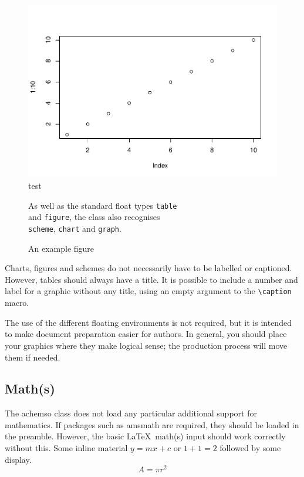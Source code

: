 \documentclass[journal=jacsat,manuscript=article]{achemso}
\begin{document}
\begin{figure}[htbp]
\centering
\includegraphics{Manuscript_files/figure-latex/unnamed-chunk-1-1.pdf}
\caption{test}
\end{figure}

\begin{figure}
  As well as the standard float types \texttt{table}\\
  and \texttt{figure}, the class also recognises\\
  \texttt{scheme}, \texttt{chart} and \texttt{graph}.
  \caption{An example figure}
  \label{fgr:example}
\end{figure}

Charts, figures and schemes do not necessarily have to be labelled or
captioned. However, tables should always have a title. It is possible to
include a number and label for a graphic without any title, using an
empty argument to the \texttt{\textbackslash caption} macro.

The use of the different floating environments is not required, but it
is intended to make document preparation easier for authors. In general,
you should place your graphics where they make logical sense; the
production process will move them if needed.

\subsection{Math(s)}\label{maths}

The \textsf{achemso} class does not load any particular additional
support for mathematics. If packages such as \textsf{amsmath} are
required, they should be loaded in the preamble. However, the basic
\LaTeX~math(s) input should work correctly without this. Some inline
material \(y = mx + c\) or \(1 + 1 = 2\) followed by some display.
\[ A = \pi r^2 \]
\end{document}
